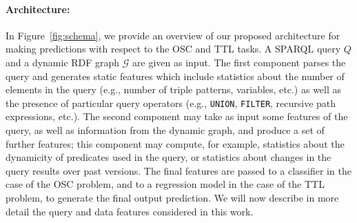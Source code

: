 \documentclass[runningheads]{llncs}
\newcommand{\ah}[1]{{\color{blue}\textsc{ah:} #1}}
\begin{document}
\paragraph{Architecture:} In Figure~\ref{fig:schema}, we provide an overview of our proposed architecture for making predictions with respect to the OSC and TTL tasks. A SPARQL query $Q$ and a dynamic RDF graph $\mathcal{G}$ are given as input. The first component parses the query and generates static features which include statistics about the number of elements in the query (e.g., number of triple patterns, variables, etc.) as well as the presence of particular query operators (e.g., \texttt{UNION}, \texttt{FILTER}, recursive path expressions, etc.). The second component may take as input some features of the query, as well as information from the dynamic graph, and produce a set of further features; this component may compute, for example, statistics about the dynamicity of predicates used in the query, or statistics about changes in the query results over past versions. The final features are passed to a classifier in the case of the OSC problem, and to a regression model in the case of the TTL problem, to generate the final output prediction. We will now describe in more detail the query and data features considered in this work.

\end{document}
